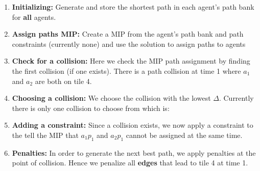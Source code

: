 \documentclass[a4paper,11pt]{article}
\begin{document}
\begin{enumerate}
	\item \textbf{Initializing:} Generate and store the shortest path in each agent's path bank for \textbf{all}  agents.
	\item \textbf{Assign paths MIP:} Create a MIP from the agent's path bank and path constraints (currently none) and use the solution to assign paths to agents
	\item \textbf{Check for a collision:} Here we check the MIP path assignment by finding the first collision (if one exists). There is a path collision at time 1 where $a_1$ and $a_2$ are both on tile 4.
	\item \textbf{Choosing a collision:} We choose the collision with the lowest $\Delta$. Currently there is only one collision to choose from which is:

	\item \textbf{Adding a constraint:} Since a collision exists, we now apply a constraint to the tell the MIP that $a_1p_1$ and $a_2p_1$ cannot be assigned at the same time.
		
	\item \textbf{Penalties:} In order to generate the next best path, we apply penalties at the point of collision. Hence we penalize all \textbf{edges} that lead to tile 4 at time 1.


\end{enumerate}
\end{document}
